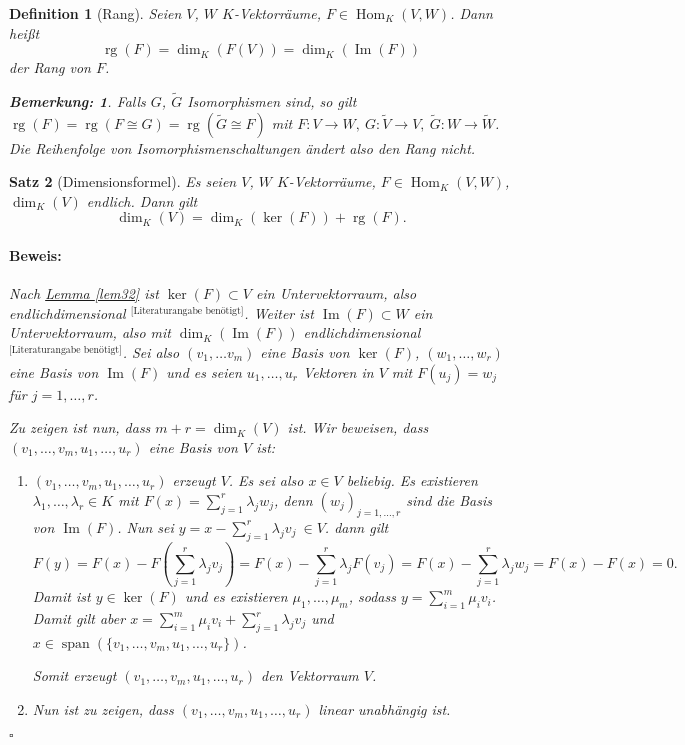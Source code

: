 \documentclass{report}
\newcommand{\lb}{\lambda}
\DeclareMathOperator{\Span}{span}
\DeclareMathOperator{\Hom}{Hom}
\DeclareMathOperator{\Ima}{Im}
\DeclareMathOperator{\rg}{rg}
\theoremstyle{customrem}
\newtheorem*{bem}{Bemerkung:}
\theoremstyle{customdef}
\newtheorem{definition}{Definition}[chapter]
\newtheorem{satz}[definition]{Satz}
\renewenvironment{proof}{\vspace{-.75cm}\paragraph{Beweis: }}{\vspace{-.5cm}\hfill$\square$}
\begin{document}
	\begin{definition}[Rang]
		Seien $V$, $W$ $K$-Vektorräume, $F\in\Hom_K(V, W)$. Dann heißt $$\rg(F)=\dim_K(F(V)) = \dim_K(\Ima(F))$$ der Rang von $F$.\\
		\begin{bem}
			Falls $G$, $\tilde{G}$ Isomorphismen sind, so gilt $\rg(F) = \rg(F\cong G) = \rg(\tilde{G}\cong F)$ mit $F:V\to W,\ G:\tilde{V}\to V,\ \tilde{G}: W\to\tilde{W}$. Die Reihenfolge von Isomorphismenschaltungen ändert also den Rang nicht.\\
		\end{bem}
	\end{definition}
	
	\begin{satz}[Dimensionsformel]
		Es seien $V$, $W$ $K$-Vektorräume, $F\in\Hom_K(V, W)$, $\dim_K(V)$ endlich. Dann gilt $$\dim_K(V) = \dim_K(\ker(F))+\rg(F).$$
		\begin{proof}
			Nach \hyperref[lem32]{Lemma \ref{lem32}} ist $\ker(F)\subset V$ ein Untervektorraum, also endlichdimensional ${}^\text{[Literaturangabe benötigt]}$. Weiter ist $\Ima(F)\subset W$ ein Untervektorraum, also mit $\dim_K(\Ima(F))$ endlichdimensional ${}^\text{[Literaturangabe benötigt]}$. Sei also $(v_1, \ldots v_m)$ eine Basis von $\ker(F)$, $(w_1,\ldots, w_r)$ eine Basis von $\Ima(F)$ und es seien $u_1,\ldots, u_r$ Vektoren in $V$ mit $F(u_j)=w_j$ für $j=1, \ldots, r$.
			
			Zu zeigen ist nun, dass $m+r=\dim_K(V)$ ist. Wir beweisen, dass $(v_1, \ldots, v_m, u_1, \ldots, u_r)$ eine Basis von $V$ ist:
			\begin{enumerate}
				\item $(v_1, \ldots, v_m, u_1, \ldots, u_r)$ erzeugt $V$. Es sei also $x\in V$ beliebig. Es existieren $\lb_1, \ldots, \lb_r\in K$ mit $F(x) = \sum_{j=1}^{r}\lb_j w_j$, denn $(w_j)_{j=1, \ldots, r}$ sind die Basis von $\Ima(F)$. Nun sei $y=x-\sum_{j=1}^{r}\lb_j v_j\ \in V$. dann gilt $$F(y) = F(x) - F\left(\sum_{j=1}^{r}\lb_j v_j\right) = F(x) - \sum_{j=1}^{r}\lb_j F(v_j)= F(x) - \sum_{j=1}^{r}\lb_j w_j = F(x)-F(x)=0.$$ Damit ist $y\in \ker(F)$ und es existieren $\mu_1, \ldots, \mu_m$, sodass $y=\sum_{i=1}^{m}\mu_i v_i$. Damit gilt aber $x=\sum_{i=1}^{m}\mu_iv_i + \sum_{j=1}^{r}\lb_jv_j$ und $x\in \Span(\{v_1, \ldots, v_m, u_1, \ldots, u_r\})$. 
				
				Somit erzeugt $(v_1, \ldots, v_m, u_1, \ldots, u_r)$ den Vektorraum $V$.
				
				\item Nun ist zu zeigen, dass $(v_1, \ldots, v_m, u_1, \ldots, u_r)$ linear unabhängig ist.
				

\end{enumerate}
\end{proof}
\end{satz}
\end{document}
